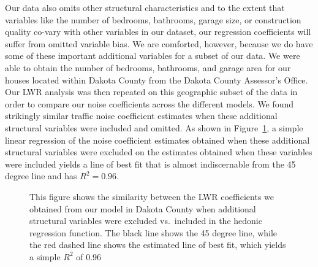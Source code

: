 \documentclass{article}\usepackage{graphicx, color}
\begin{document}
Our data also omits other structural characteristics and to the extent that variables like the number of bedrooms, bathrooms, garage size, or construction quality co-vary with other variables in our dataset, our regression coefficients will suffer from omitted variable bias. We are comforted, however, because we do have some of these important additional variables for a subset of our data. We were able to obtain the number of bedrooms, bathrooms, and garage area for our houses located within Dakota County from the Dakota County Assessor's Office. Our LWR analysis was then repeated on this geographic subset of the data in order to compare our noise coefficients across the different models. We found strikingly similar traffic noise coefficient estimates when these additional structural variables were included and omitted. As shown in Figure~\ref{fig:DAK}, a simple linear regression of the noise coefficient estimates obtained when these additional structural variables were excluded on the estimates obtained when these variables were included yields a line of best fit that is almost indiscernable from the 45 degree line and has $R^2 = 0.96$. %

\begin{figure}
\caption{This figure shows the similarity between the LWR coefficients we obtained from our model in Dakota County when additional structural variables were excluded vs.\ included in the hedonic regression function. The black line shows the 45 degree line, while the red dashed line shows the estimated line of best fit, which yields a simple $R^2$ of 0.96}\label{fig:DAK}
\end{figure}
\end{document}
